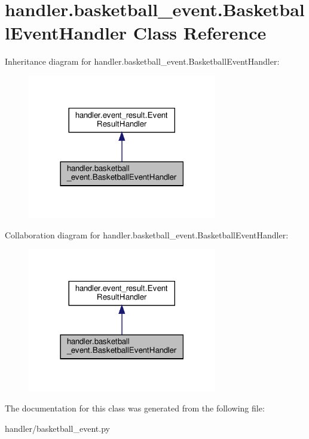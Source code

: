 \hypertarget{classhandler_1_1basketball__event_1_1_basketball_event_handler}{}\section{handler.\+basketball\+\_\+event.\+Basketball\+Event\+Handler Class Reference}
\label{classhandler_1_1basketball__event_1_1_basketball_event_handler}


Inheritance diagram for handler.\+basketball\+\_\+event.\+Basketball\+Event\+Handler\+:
\nopagebreak
\begin{figure}[H]
\begin{center}
\leavevmode
\includegraphics[width=234pt]{classhandler_1_1basketball__event_1_1_basketball_event_handler__inherit__graph}
\end{center}
\end{figure}


Collaboration diagram for handler.\+basketball\+\_\+event.\+Basketball\+Event\+Handler\+:
\nopagebreak
\begin{figure}[H]
\begin{center}
\leavevmode
\includegraphics[width=234pt]{classhandler_1_1basketball__event_1_1_basketball_event_handler__coll__graph}
\end{center}
\end{figure}


The documentation for this class was generated from the following file\+:\begin{DoxyCompactItemize}
\item 
handler/basketball\+\_\+event.\+py\end{DoxyCompactItemize}
